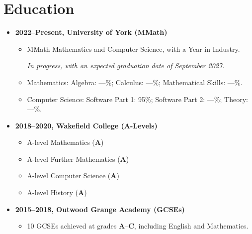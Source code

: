 \documentclass[final]{article}
\begin{document}
\section{Education}
\begin{itemize}
        \item \textbf{2022--Present, University of York (MMath)}
        \begin{itemize}
                \item MMath Mathematics and Computer Science, with a Year in
                Industry.

                \textit{In progress, with an expected graduation date of
                September 2027.}

                \item Mathematics: Algebra: ---\%; Calculus: ---\%; Mathematical
                Skills: ---\%.

                \item Computer Science: Software Part 1: 95\%; Software Part 2:
                ---\%; Theory: ---\%.
        \end{itemize}
        \item \textbf{2018--2020, Wakefield College (A-Levels)}
        \begin{itemize}
                \item A-level Mathematics (\textbf{A})
                \item A-level Further Mathematics (\textbf{A})
                \item A-level Computer Science (\textbf{A})
                \item A-level History (\textbf{A})
        \end{itemize}
        \item \textbf{2015--2018, Outwood Grange Academy (GCSEs)}
        \begin{itemize}
                \item 10 GCSEs achieved at grades \textbf{A}--\textbf{C},
                including English and Mathematics.
        \end{itemize}
\end{itemize}

%
%
\end{document}
